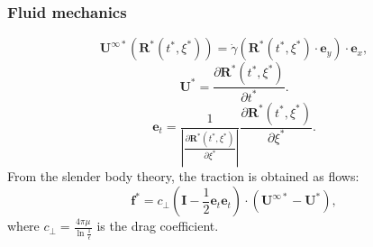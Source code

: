 \documentclass{beamer}
\begin{document}



\begin{frame}
	\frametitle{Fluid mechanics}
	\begin{overlayarea}{\textwidth}{\textheight}
	\begin{equation*}
		\mathbf{U}^{\infty*}(\mathbf{R}^*(t^*,\xi^*))=\dot{\gamma}\left(\mathbf{R}^*(t^*,\xi^*)\cdot\mathbf{e}_y\right)\cdot\mathbf{e}_x,
	\end{equation*}
	\begin{equation*}
		\mathbf{U}^*=\frac{\partial\mathbf{R}^*(t^*,\xi^*)}{\partial t^*}.
	\end{equation*}
	\begin{equation*}
		\mathbf{e}_t=\frac{1}{|\frac{\partial\mathbf{R}^*(t^*,\xi^*)}{\partial\xi^*}|}\frac{\partial\mathbf{R}^*(t^*,\xi^*)}{\partial\xi^*}.
	\end{equation*}
	From the slender body theory, the traction is obtained as flows:
	\begin{equation*}
		\label{eqn:24}
		\mathbf{f}^*=c_\perp\left(\mathbf{I}-\frac{1}{2}\mathbf{e}_t\mathbf{e}_t\right)\cdot(\mathbf{U}^{\infty*}-\mathbf{U}^*),
	\end{equation*}
	where $c_\perp=\frac{4\pi\mu}{\ln{\frac{1}{\epsilon}}}$ is the drag coefficient.
	\end{overlayarea}
\end{frame}

\end{document}
